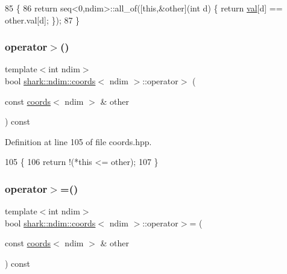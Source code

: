 \begin{DoxyCode}
85         \{
86             \textcolor{keywordflow}{return} seq<0,ndim>::all\_of([\textcolor{keyword}{this},&other](\textcolor{keywordtype}{int} d) \{ \textcolor{keywordflow}{return} \hyperlink{structshark_1_1ndim_1_1coords_a425262af388367b0f0079218e038aef5}{val}[d] == other.val[d]; \});
87         \}
\end{DoxyCode}
\hypertarget{structshark_1_1ndim_1_1coords_abef8a867112ca851dc39c030ef57bd82}{}\label{structshark_1_1ndim_1_1coords_abef8a867112ca851dc39c030ef57bd82} 
\subsubsection{\texorpdfstring{operator$>$()}{operator>()}}
{\footnotesize\ttfamily template$<$int ndim$>$ \\
bool \hyperlink{structshark_1_1ndim_1_1coords}{shark\+::ndim\+::coords}$<$ ndim $>$\+::operator$>$ (\begin{DoxyParamCaption}\item[{const \hyperlink{structshark_1_1ndim_1_1coords}{coords}$<$ ndim $>$ \&}]{other }\end{DoxyParamCaption}) const\hspace{0.3cm}{\ttfamily [inline]}}



Definition at line 105 of file coords.\+hpp.


\begin{DoxyCode}
105                                                                            \{
106             \textcolor{keywordflow}{return} !(*\textcolor{keyword}{this} <= other);
107         \}
\end{DoxyCode}
\hypertarget{structshark_1_1ndim_1_1coords_ac88fb12351942d33b2041941c0109258}{}\label{structshark_1_1ndim_1_1coords_ac88fb12351942d33b2041941c0109258} 
\subsubsection{\texorpdfstring{operator$>$=()}{operator>=()}}
{\footnotesize\ttfamily template$<$int ndim$>$ \\
bool \hyperlink{structshark_1_1ndim_1_1coords}{shark\+::ndim\+::coords}$<$ ndim $>$\+::operator$>$= (\begin{DoxyParamCaption}\item[{const \hyperlink{structshark_1_1ndim_1_1coords}{coords}$<$ ndim $>$ \&}]{other }\end{DoxyParamCaption}) const\hspace{0.3cm}{\ttfamily [inline]}}



